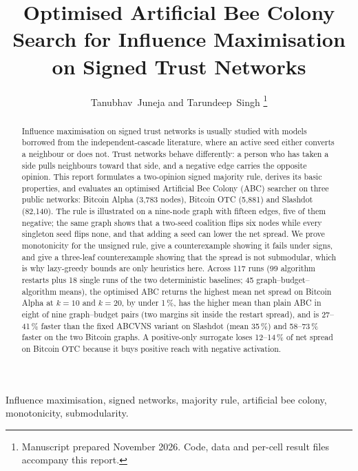 \documentclass[journal,letterpaper,10pt]{IEEEtran}
\begin{document}
\title{Optimised Artificial Bee Colony Search for Influence Maximisation on Signed Trust Networks}

\author{Tanubhav~Juneja and Tarundeep~Singh%
\thanks{Manuscript prepared November 2026. Code, data and per-cell result files accompany this report.}}

\maketitle

\begin{abstract}
Influence maximisation on signed trust networks is usually studied with models borrowed from the independent-cascade literature, where an active seed either converts a neighbour or does not. Trust networks behave differently: a person who has taken a side pulls neighbours toward that side, and a negative edge carries the opposite opinion. This report formulates a two-opinion signed majority rule, derives its basic properties, and evaluates an optimised Artificial Bee Colony (ABC) searcher on three public networks: Bitcoin Alpha (3{,}783 nodes), Bitcoin OTC (5{,}881) and Slashdot (82{,}140). The rule is illustrated on a nine-node graph with fifteen edges, five of them negative; the same graph shows that a two-seed coalition flips six nodes while every singleton seed flips none, and that adding a seed can lower the net spread. We prove monotonicity for the unsigned rule, give a counterexample showing it fails under signs, and give a three-leaf counterexample showing that the spread is not submodular, which is why lazy-greedy bounds are only heuristics here. Across 117 runs (99 algorithm restarts plus 18 single runs of the two deterministic baselines; 45 graph--budget--algorithm means), the optimised ABC returns the highest mean net spread on Bitcoin Alpha at $k=10$ and $k=20$, by under 1\,\%, has the higher mean than plain ABC in eight of nine graph--budget pairs (two margins sit inside the restart spread), and is 27--41\,\% faster than the fixed ABCVNS variant on Slashdot (mean 35\,\%) and 58--73\,\% faster on the two Bitcoin graphs. A positive-only surrogate loses 12--14\,\% of net spread on Bitcoin OTC because it buys positive reach with negative activation.
\end{abstract}

\begin{IEEEkeywords}
Influence maximisation, signed networks, majority rule, artificial bee colony, monotonicity, submodularity.
\end{IEEEkeywords}
\end{document}
